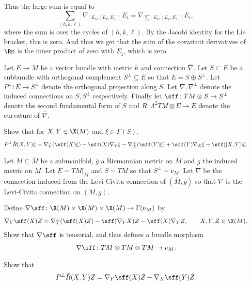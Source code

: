     Thus the large sum is equal to
    $$ \sum_{(h,k,\ell)}\nabla_{[E_h,[E_k,E_\ell]]}E_i = \nabla_{\sum[E_h,[E_k,E_\ell]]}E_i , $$
    where the sum is over the cycles of $(h,k,\ell)$.
    By the Jacobi identity for the Lie bracket, this is zero.
    And thus we get that the sum of the covariant derivatives of $\Rm$ is the inner product of zero with $E_j$, which is zero.
\eenum

\bprob

    Let $E\to M$ be a vector bundle with metric $h$ and connection $\bar\nabla$.
    Let $S\subseteq E$ be a subbundle with orthogonal complement $S^\perp\subseteq E$ so that $E=S\oplus S^\perp$.
    Let $P^\perp\colon E\to S^\perp$ denote the orthogonal projection along $S$.
    Let $\nabla,\nabla^\perp$ denote the induced connections on $S,S^\perp$ respectively.
    Finally let $\sff\colon TM\otimes S\to S^\perp$ denote the second fundamental form of $S$ and $\bar R\colon\Lambda^2TM\otimes E\to E$ denote the curvature of $\bar\nabla$.
    \benum
        \item Show that for $X,Y\in\X(M)$ and $\xi\in\Gamma(S)$,
        $$ P^\perp\bar R(X,Y)\xi = \nabla^\perp_Y(\sff(X)\xi) - \sff(X)\nabla_Y\xi - \nabla^\perp_X(\sff(Y)\xi) + \sff(Y)\nabla_X\xi + \sff([X,Y])\xi . $$
        \item Let $M\subseteq\bar M$ be a submanifold, $\bar g$ a Riemannian metric on $\bar M$ and $g$ the induced metric on $M$.
        Let $E=T\bar M|_M$ and $S=TM$ so that $S^\perp=\nu_M$.
        Let $\bar\nabla$ be the connection induced from the Levi-Civita connection of $(\bar M,\bar g)$ so that $\nabla$ is the Levi-Civita connection on $(M,g)$.
        \benum
            \item Define $\nabla\sff\colon\X(M)\times\X(M)\times\X(M)\to\Gamma(\nu_M)$ by
            $$ \nabla_Y\sff(X)Z = \nabla^\perp_Y(\sff(X)Z) - \sff(\nabla_YX)Z - \sff(X)\nabla_YZ,\qquad X,Y,Z\in\X(M) . $$
            Show that $\nabla\sff$ is tensorial, and thus defines a bundle morphism
            $$ \nabla\sff\colon TM\otimes TM\otimes TM\to\nu_M . $$
            \item Show that
            $$ P^\perp\bar R(X,Y)Z = \nabla_Y\sff(X)Z - \nabla_X\sff(Y)Z . $$
        \eenum
    \eenum

\eprob

